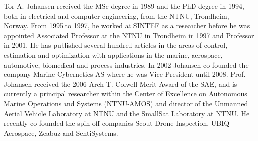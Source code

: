 \begin{IEEEbiography}{Tor A. Johansen}
received the MSc degree in 1989 
and the PhD degree in 1994, both in electrical and computer 
engineering, from the NTNU, Trondheim, Norway. From 1995 to 1997, he worked at SINTEF as a 
researcher before he was appointed Associated Professor at the 
NTNU in Trondheim in 1997 and  Professor in 2001. He has published several hundred articles 
in the areas of control, estimation and optimization with 
applications in the marine, aerospace, automotive, biomedical and process 
industries. In 2002 Johansen co-founded the company Marine 
Cybernetics AS where he was Vice President until 2008. Prof. 
Johansen received the 2006 Arch T. Colwell Merit Award of the SAE, 
and is currently a principal researcher within the Center of 
Excellence on Autonomous Marine Operations and Systems (NTNU-AMOS) 
and director of the Unmanned Aerial Vehicle Laboratory at NTNU and the 
SmallSat Laboratory at NTNU. He recently co-founded the spin-off 
companies Scout Drone Inspection, UBIQ Aerospace, Zeabuz and SentiSystems. 
\end{IEEEbiography}


